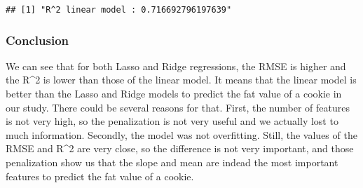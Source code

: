 \documentclass[
]{article}
\begin{document}
\begin{verbatim}
## [1] "R^2 linear model : 0.716692796197639"
\end{verbatim}

\subsubsection{Conclusion}\label{conclusion}

We can see that for both Lasso and Ridge regressions, the RMSE is higher
and the R\^{}2 is lower than those of the linear model. It means that
the linear model is better than the Lasso and Ridge models to predict
the fat value of a cookie in our study. There could be several reasons
for that. First, the number of features is not very high, so the
penalization is not very useful and we actually lost to much
information. Secondly, the model was not overfitting. Still, the values
of the RMSE and R\^{}2 are very close, so the difference is not very
important, and those penalization show us that the slope and mean are
indead the most important features to predict the fat value of a cookie.
\end{document}

